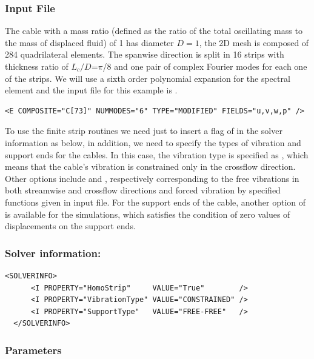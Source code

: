 \subsubsection{Input File}

The cable with a mass ratio (defined as the ratio of the total oscillating mass to the mass of displaced fluid) of 1 has diameter $D=1$, the 2D mesh is composed of 284 quadrilateral elements. The spanwise direction is split in 16 strips with thickness ratio of $L_c/D$=$\pi$/8 and one pair of complex Fourier modes for each one of the strips. We will use a sixth order polynomial expansion for the spectral element and the input file for this example is .



\begin{lstlisting}[style=XMLStyle]
<E COMPOSITE="C[73]" NUMMODES="6" TYPE="MODIFIED" FIELDS="u,v,w,p" />
\end{lstlisting}

To use the finite strip routines we need just to insert a flag of  in the solver information as below, in addition, we need to specify the types of vibration and support ends for the cables. In this case, the vibration type is specified as , which means that the cable's vibration is constrained only in the crossflow direction. Other options include  and , respectively corresponding to the free vibrations in both streamwise and crossflow directions and forced vibration by specified functions given in input file. For the support ends of the cable, another option of  is available for the simulations, which satisfies the condition of zero values of displacements on the support ends.

\subsubsection{Solver information:~}
\begin{lstlisting}[style=XMLStyle]
  <SOLVERINFO>
      <I PROPERTY="HomoStrip"     VALUE="True"        />
      <I PROPERTY="VibrationType" VALUE="CONSTRAINED" />
      <I PROPERTY="SupportType"   VALUE="FREE-FREE"   />
  </SOLVERINFO>
\end{lstlisting}
        
\subsubsection{Parameters}

